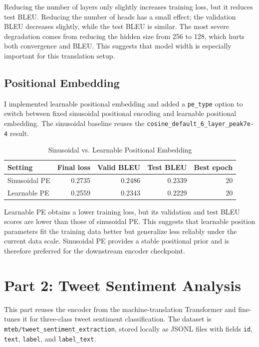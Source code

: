 \documentclass[a4paper,12pt]{article}
\begin{document}
Reducing the number of layers only slightly increases training loss, but it reduces test BLEU. Reducing the number of heads has a small effect; the validation BLEU decreases slightly, while the test BLEU is similar. The most severe degradation comes from reducing the hidden size from 256 to 128, which hurts both convergence and BLEU. This suggests that model width is especially important for this translation setup.

\subsection{Positional Embedding}

I implemented learnable positional embedding and added a \texttt{pe\_type} option to switch between fixed sinusoidal positional encoding and learnable positional embedding. The sinusoidal baseline reuses the \texttt{cosine\_default\_6\_layer\_peak7e-4} result.

\begin{table}[H]
\centering
\caption{Sinusoidal vs. Learnable Positional Embedding}
\label{tab:position-embedding-en}
\begin{tabular}{lrrrr}
\toprule
Setting & Final loss & Valid BLEU & Test BLEU & Best epoch \\
\midrule
Sinusoidal PE & 0.2735 & 0.2486 & 0.2339 & 20 \\
Learnable PE & 0.2559 & 0.2343 & 0.2229 & 20 \\
\bottomrule
\end{tabular}
\end{table}

Learnable PE obtains a lower training loss, but its validation and test BLEU scores are lower than those of sinusoidal PE. This suggests that learnable position parameters fit the training data better but generalize less reliably under the current data scale. Sinusoidal PE provides a stable positional prior and is therefore preferred for the downstream encoder checkpoint.

\section{Part 2: Tweet Sentiment Analysis}

This part reuses the encoder from the machine-translation Transformer and fine-tunes it for three-class tweet sentiment classification. The dataset is \texttt{mteb/tweet\_sentiment\_extraction}, stored locally as JSONL files with fields \texttt{id}, \texttt{text}, \texttt{label}, and \texttt{label\_text}.
\end{document}
